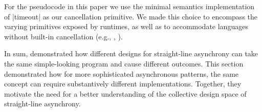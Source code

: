 For the pseudocode in this paper we use the minimal semantics implementation of \code|timeout| as our cancellation primitive. We made this choice to encompass the varying primitives exposed by runtimes, as well as to accommodate languages without built-in cancellation (e.g., \Js, \CSharp).

In sum,  demonstrated how different designs for straight-line asynchrony can take the same simple-looking program and cause different outcomes. This section demonstrated how for more sophisticated asynchronous patterns, the same concept can require substantively different implementations. Together, they motivate the need for a better understanding of the collective design space of straight-line asynchrony.
